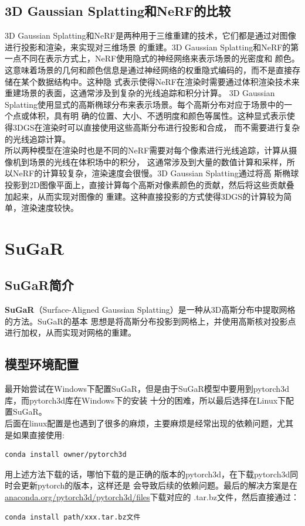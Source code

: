 \documentclass{nwputhesis}
\begin{document}
\subsection{3D Gaussian Splatting和NeRF的比较}
\indent
3D Gaussian Splatting和NeRF是两种用于三维重建的技术，它们都是通过对图像进行投影和渲染，来实现对三维场景
的重建。3D Gaussian Splatting和NeRF的第一点不同在表示方式上，NeRF使用隐式的神经网络来表示场景的光密度和
颜色。这意味着场景的几何和颜色信息是通过神经网络的权重隐式编码的，而不是直接存储在某个数据结构中。这种隐
式表示使得NeRF在渲染时需要通过体积渲染技术来重建场景的表面，这通常涉及到复杂的光线追踪和积分计算。
3D Gaussian Splatting使用显式的高斯椭球分布来表示场景。每个高斯分布对应于场景中的一个点或体积，具有明
确的位置、大小、不透明度和颜色等属性。这种显式表示使得3DGS在渲染时可以直接使用这些高斯分布进行投影和合成，
而不需要进行复杂的光线追踪计算。\\
\indent
所以两种模型在渲染时也是不同的NeRF需要对每个像素进行光线追踪，计算从摄像机到场景的光线在体积场中的积分，
这通常涉及到大量的数值计算和采样，所以NeRF的计算较复杂，渲染速度会很慢。3D Gaussian Splatting通过将高
斯椭球投影到2D图像平面上，直接计算每个高斯对像素颜色的贡献，然后将这些贡献叠加起来，从而实现对图像的
重建。这种直接投影的方式使得3DGS的计算较为简单，渲染速度较快。\\
\makespace
\hypertarget{sugar}{}
\section{SuGaR}
\subsection{SuGaR简介}
\textbf{SuGaR}（Surface-Aligned Gaussian Splatting）是一种从3D高斯分布中提取网格的方法。SuGaR的基本
思想是将高斯分布投影到网格上，并使用高斯核对投影点进行加权，从而实现对网格的重建。
\subsection{模型环境配置}
最开始尝试在Windows下配置SuGaR，但是由于SuGaR模型中要用到pytorch3d库，而pytorch3d库在Windows下的安装
十分的困难，所以最后选择在Linux下配置SuGaR。\\
\indent
后面在linux配置是也遇到了很多的麻烦，主要麻烦是经常出现的依赖问题，尤其是如果直接使用:
\begin{lstlisting}[language=bash]
    conda install owner/pytorch3d
\end{lstlisting}

\indent
用上述方法下载的话，哪怕下载的是正确的版本的pytorch3d，在下载pytorch3d同时会更新pytorch的版本，这样还是
会导致后续的依赖问题。最后的解决方案是在\underline{anaconda.org/pytorch3d/pytorch3d/files}下载对应的
.tar.bz文件，然后直接通过：
\begin{lstlisting}[language=bash]
    conda install path/xxx.tar.bz文件
\end{lstlisting}
\end{document}
